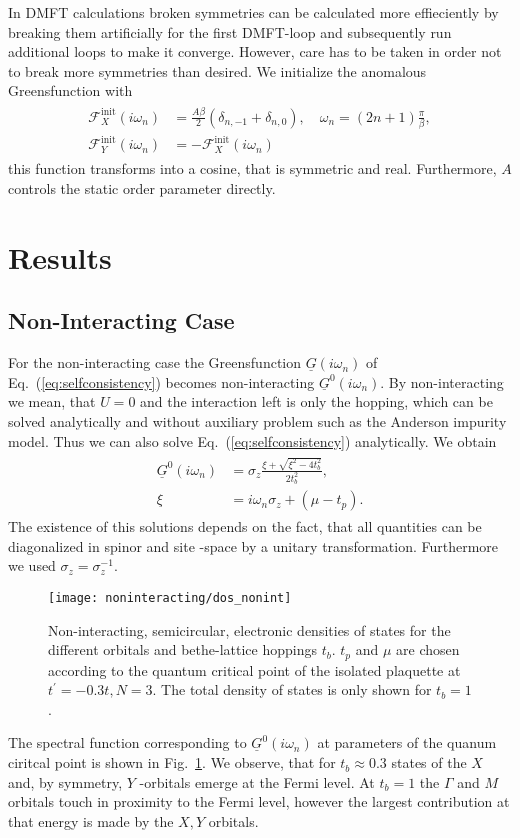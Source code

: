 \documentclass[aps,prb,twocolumn,groupedaddress,amsmath,amssymb]{revtex4-1}
\newcommand{\refeq}[1]{Eq.~(\ref{#1})}
\newcommand{\reffig}[1]{Fig.~\ref{#1}}
\newcommand{\nambu}[1]{\mathcal{#1}}
\newcommand{\Nambu}[1]{\underline{#1}}
\begin{document}
In DMFT calculations broken symmetries can be calculated more effieciently by breaking them artificially for the first DMFT-loop and subsequently run additional loops to make it converge. However, care has to be taken in order not to break more symmetries than desired. We initialize the anomalous Greensfunction with
\begin{align}
  \label{eq:anomiwinit}
  \begin{split}
    \nambu{F}_X^{\mathrm{init}}(i\omega_n) &= \frac{A\beta}{2}\left( \delta_{n,-1} + \delta_{n, 0}\right),\quad \omega_n = \left(2n+1\right)\frac{\pi}{\beta},\\
    \nambu{F}_Y^{\mathrm{init}}(i\omega_n) &= -\nambu{F}_X^{\mathrm{init}}(i\omega_n)
  \end{split}
\end{align}
this function transforms into a cosine, that is symmetric and real. Furthermore, $A$ controls the static order parameter directly.

\section{Results}
\subsection{Non-Interacting Case}
For the non-interacting case the Greensfunction $\Nambu{G}(i\omega_n)$ of \refeq{eq:selfconsistency} becomes non-interacting $\Nambu{G}^0(i\omega_n)$. By non-interacting we mean, that $U=0$ and the interaction left is only the hopping, which can be solved analytically and without auxiliary problem such as the Anderson impurity model. Thus we can also solve \refeq{eq:selfconsistency} analytically. We obtain
\begin{align}
  \label{eq:uzero}
  \begin{split}
  \Nambu{G}^0(i\omega_n)&=\sigma_z\frac{\xi+\sqrt{\xi^2 - 4t^2_b}}{2t^2_b},\\
  \xi&=i\omega_n\sigma_z+\left(\mu - t_p\right).
  \end{split}
\end{align}
The existence of this solutions depends on the fact, that all quantities can be diagonalized in spinor and site -space by a unitary transformation. Furthermore we used $\sigma_z = \sigma^{-1}_z$.
\begin{figure}[th]
  \texttt{[image: noninteracting/dos\_nonint]}
  \caption{Non-interacting, semicircular, electronic densities of states for the different orbitals and bethe-lattice hoppings $t_b$. $t_p$ and $\mu$ are chosen according to the quantum critical point of the isolated plaquette at $t^\prime=-0.3t, N=3$. The total density of states is only shown for $t_b=1$.}
  \label{fig:nonint}
\end{figure}
The spectral function corresponding to $\Nambu{G}^0(i\omega_n)$ at parameters of the quanum ciritcal point is shown in \reffig{fig:nonint}. We observe, that for $t_b\approx 0.3$ states of the $X$ and, by symmetry, $Y$ -orbitals emerge at the Fermi level. At $t_b=1$ the $\Gamma$ and $M$ orbitals touch in proximity to the Fermi level, however the largest contribution at that energy is made by the $X,Y$ orbitals.
\end{document}

